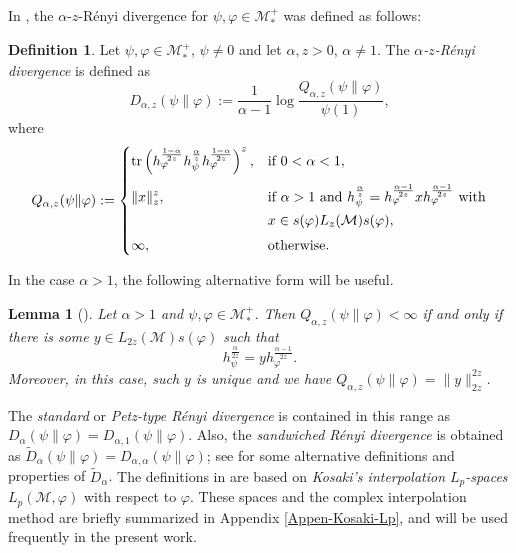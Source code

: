 \documentclass[12pt]{article}
\newtheorem{lemma}[theorem]{Lemma}
\theoremstyle{definition}
\newtheorem{defi}[theorem]{Definition}
\theoremstyle{remark}
\numberwithin{equation}{section}
\def\Me{\mathcal M}
\def\Tr{\mathrm{tr}}
\begin{document}

In \cite{kato2023aremark, kato2023onrenyi}, the
$\alpha$-$z$-R\'enyi divergence for $\psi,\varphi\in \mathcal M_*^+$  was defined as follows:

\begin{defi}\label{defi:renyi} Let $\psi,\varphi\in \Me_*^+$, $\psi\ne 0$ and let
$\alpha,z>0$, $\alpha\ne 1$. The \emph{$\alpha$-$z$-R\'enyi divergence} is defined as 
\[
D_{\alpha,z}(\psi\|\varphi):=\frac1{\alpha-1}\log
\frac{Q_{\alpha,z}(\psi\|\varphi)}{\psi(1)},
\]
where
\[
Q_{\alpha,z}(\psi\|\varphi):=\begin{dcases} \Tr
\left(h_\varphi^{\frac{1-\alpha}{2z}}h_\psi^{\frac{\alpha}{z}}h_\varphi^{\frac{1-\alpha}{2z}}\right)^z, &
\text{if } 0<\alpha<1,\\[0.3em]
\|x\|_z^z, & \text{if } \alpha>1 \text{ and }
h_\psi^{\frac{\alpha}{z}}=h_\varphi^{\frac{\alpha-1}{2z}}xh_\varphi^{\frac{\alpha-1}{2z}}
\ \text{with}\\ & x\in s(\varphi)L_z(\Me)s(\varphi),\\[0.3em]
\infty,& \text{otherwise}.
\end{dcases}
\]
\end{defi}


In the case $\alpha>1$, the following alternative form will be useful.

\begin{lemma}[\mbox{\cite[Lemma 7]{kato2023onrenyi}}]\label{lemma:renyi_2z}
Let $\alpha>1$ and $\psi,\varphi\in \Me_*^+$. Then $Q_{\alpha,z}(\psi\|\varphi)<\infty$ if
and only if there is some $y\in L_{2z}(\Me)s(\varphi)$ such that 
\[
h_\psi^{\frac{\alpha}{2z}}=yh_\varphi^{\frac{\alpha-1}{2z}}.
\]
Moreover, in this case, such $y$ is unique and we have
$Q_{\alpha,z}(\psi\|\varphi)=\|y\|_{2z}^{2z}$. 
\end{lemma}

The \emph{standard} or \emph{Petz-type R\'enyi divergence}
\cite{petz1985quasi,hiai2018quantum,hiai2021quantum} is contained in this range as
$D_\alpha(\psi\|\varphi)=D_{\alpha,1}(\psi\|\varphi)$. Also, the \emph{sandwiched R\'enyi divergence} is
obtained as $\tilde D_\alpha(\psi\|\varphi)=D_{\alpha,\alpha}(\psi\|\varphi)$; see
\cite{berta2018renyi,hiai2021quantum,jencova2018renyi, jencova2021renyi} for some
alternative definitions and properties of $\tilde D_\alpha$. {\color{red}The definitions in
\cite{jencova2018renyi,jencova2021renyi} are based on \emph{Kosaki's interpolation $L_p$-spaces}
$L_p(\Me,\varphi)$ \cite{kosaki1984applications} with respect to $\varphi$. These spaces and the
complex interpolation method are briefly summarized in Appendix \ref{Appen-Kosaki-Lp}, and will be used
frequently in the present work.}
\end{document}
